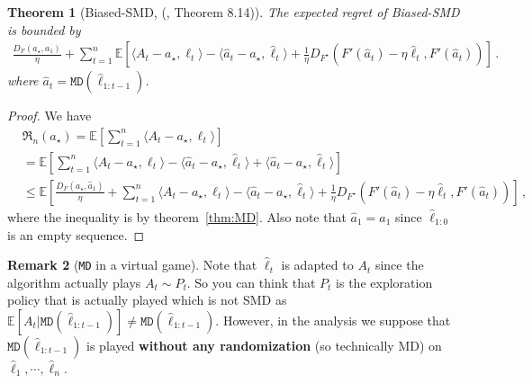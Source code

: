 \documentclass{article}
\theoremstyle{plain}
\newtheorem{theorem}{Theorem}
\theoremstyle{definition}
\newtheorem{remark}[theorem]{Remark}
\newcommand{\Reg}{\mathfrak{R}}
\newcommand{\E}{\mathbb E}
\newcommand{\fmd}{\texttt{MD}}
\newcommand{\mdalg}{\textsf{MD}\xspace}
\newcommand{\smdalg}{\textsf{SMD}\xspace}
\newcommand{\hl}{\hat{\ell}\xspace}
\begin{document}
\begin{theorem}[Biased-\smdalg, (\cite{lattimore2024bandit}, Theorem 8.14)]\label{thm:SMD-biased}
    The expected regret of Biased-\smdalg is bounded by
    \begin{align*}
        \frac{D_F(a_\star, a_1)}{\eta} +
        \sum_{t=1}^{n}
        \E\left[
            \langle A_t - a_\star, \ell_t\rangle
            - \langle \hat{a}_t - a_\star, \hl_t\rangle
            + \frac{1}{\eta} D_{F^\star}(F'(\hat{a}_t) - \eta \hl_t, F'(\hat{a}_t))
            \right]\,.
    \end{align*}
    where $\hat{a}_t = \fmd(\hl_{1:t-1})$.
\end{theorem}
\begin{proof}
    We have
    \begin{align*}
         & \Reg_n(a_\star)
        =
        \E\left[
            \sum_{t=1}^{n}
            \langle A_t - a_\star, \ell_t\rangle
        \right]            \\
         & =
        \E\left[
            \sum_{t=1}^{n}
            \langle A_t - a_\star, \ell_t\rangle
            - \langle \hat{a}_t - a_\star, \hl_t\rangle
            + \langle \hat{a}_t - a_\star, \hl_t\rangle
            \right]
        \\
         & \leq
        \E\left[
            \frac{D_F(a_\star, \hat{a}_1)}{\eta}
            +
            \sum_{t=1}^{n}
            \langle A_t - a_\star, \ell_t\rangle
            - \langle \hat{a}_t - a_\star, \hl_t\rangle
            + \frac{1}{\eta} D_{F^\star}(F'(\hat{a}_t) - \eta \hl_t, F'(\hat{a}_t))
            \right]\,,
    \end{align*}
    where the inequality is by theorem~\ref{thm:MD}.
    Also note that $\hat{a}_1 = a_1$ since $\hl_{1:0}$ is an empty sequence.
\end{proof}
\begin{remark}[\fmd{} in a virtual game]
    Note that $\hl_t$ is adapted to $A_t$ since the algorithm actually plays
    $A_t \sim P_t$.
    So you can think that $P_t$ is the exploration policy that
    is actually played which is not \smdalg as
    $\E[A_t|\fmd(\hl_{1:t-1})] \neq \fmd(\hl_{1:t-1})$.
    However, in the analysis we suppose that $\fmd(\hl_{1:t-1})$ is played
    \textbf{without any randomization} (so technically \mdalg) on
    $\hl_1, \cdots, \hl_n$.
\end{remark}
\end{document}
